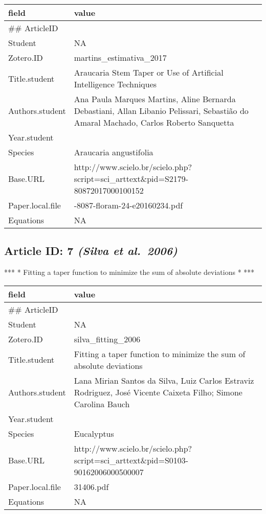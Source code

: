 \documentclass[]{article}
\begin{document}
\begin{table}[H]
\centering
\begin{tabular}{>{\raggedright\arraybackslash}p{2cm}>{\raggedright\arraybackslash}p{8cm}}
\toprule
field & value\\
\midrule
\#\# ArticleID & 6\\
Student & NA\\
Zotero.ID & martins\_estimativa\_2017\\
Title.student & Araucaria Stem Taper or Use of Artificial Intelligence Techniques\\
Authors.student & Ana Paula Marques Martins, Aline Bernarda Debastiani, Allan Libanio Pelissari, Sebastião do Amaral Machado, Carlos Roberto Sanquetta\\
\addlinespace
Year.student & 2017\\
Species & Araucaria angustifolia\\
Base.URL & http://www.scielo.br/scielo.php?script=sci\_arttext\&pid=S2179-80872017000100152\\
Paper.local.file & 2179-8087-floram-24-e20160234.pdf\\
Equations & NA\\
\bottomrule
\end{tabular}
\end{table}

\hypertarget{article-id-7-silva-et-al.2006}{%
\subsection{\texorpdfstring{Article ID: 7 \textbf{\emph{(Silva et
al.~2006)}}}{Article ID: 7 (Silva et al.~2006)}}\label{article-id-7-silva-et-al.2006}}

*** * Fitting a taper function to minimize the sum of absolute
deviations * ***

\begin{table}[H]
\centering
\begin{tabular}{>{\raggedright\arraybackslash}p{2cm}>{\raggedright\arraybackslash}p{8cm}}
\toprule
field & value\\
\midrule
\#\# ArticleID & 7\\
Student & NA\\
Zotero.ID & silva\_fitting\_2006\\
Title.student & Fitting a taper function to minimize the sum of absolute deviations\\
Authors.student & Lana Mirian Santos da Silva, Luiz Carlos Estraviz Rodriguez, José Vicente Caixeta Filho; Simone Carolina Bauch\\
\addlinespace
Year.student & 2006\\
Species & Eucalyptus\\
Base.URL & http://www.scielo.br/scielo.php?script=sci\_arttext\&pid=S0103-90162006000500007\\
Paper.local.file & 31406.pdf\\
Equations & NA\\
\bottomrule
\end{tabular}
\end{table}
\end{document}
